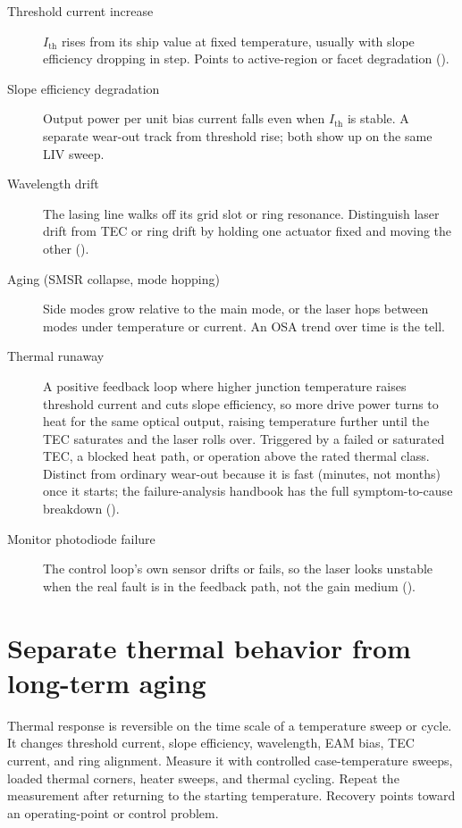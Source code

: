 \begin{description}
\item[Threshold current increase] $I_\mathrm{th}$ rises from its ship value at
      fixed temperature, usually with slope efficiency dropping in step. Points to
      active-region or facet degradation ().
\item[Slope efficiency degradation] Output power per unit bias current falls even
      when $I_\mathrm{th}$ is stable. A separate wear-out track from threshold rise;
      both show up on the same LIV sweep.
\item[Wavelength drift] The lasing line walks off its grid slot or ring resonance.
      Distinguish laser drift from TEC or ring drift by holding one actuator fixed
      and moving the other ().
\item[Aging (SMSR collapse, mode hopping)] Side modes grow relative to the main
      mode, or the laser hops between modes under temperature or current. An OSA
      trend over time is the tell.
\item[Thermal runaway] A positive feedback loop where higher junction temperature
      raises threshold current and cuts slope efficiency, so more drive power turns
      to heat for the same optical output, raising temperature further until the
      TEC saturates and the laser rolls over. Triggered by a failed or saturated
      TEC, a blocked heat path, or operation above the rated thermal class. Distinct
      from ordinary wear-out because it is fast (minutes, not months) once it
      starts; the failure-analysis handbook has the full symptom-to-cause
      breakdown ().
\item[Monitor photodiode failure] The control loop's own sensor drifts or fails,
      so the laser looks unstable when the real fault is in the feedback path, not
      the gain medium ().
\end{description}

\section{Separate thermal behavior from long-term aging}
\label{sec:laser-thermal-vs-aging}

Thermal response is reversible on the time scale of a temperature sweep or
cycle. It changes threshold current, slope efficiency, wavelength, EAM bias,
TEC current, and ring alignment. Measure it with controlled case-temperature
sweeps, loaded thermal corners, heater sweeps, and thermal cycling. Repeat the
measurement after returning to the starting temperature. Recovery points toward
an operating-point or control problem.

